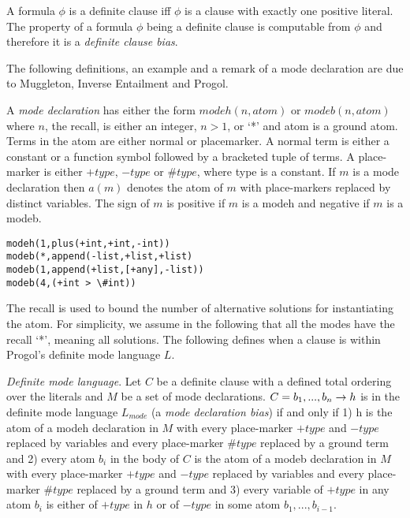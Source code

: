 \begin{defn}
A formula $\phi$ is a definite clause iff $\phi$ is a clause with exactly one positive literal. The property of a formula $\phi$ being a definite clause is computable from $\phi$ and therefore it is a \emph{definite clause bias}.
\end{defn}

The following definitions, an example and a remark of a mode declaration are due to Muggleton, Inverse Entailment and Progol\cite{muggleton1995inverse}.
\begin{defn}\cite{muggleton1995inverse}
A \emph{mode declaration} has either the form
$modeh(n,atom)$ or $modeb(n,atom)$ where $n$, the recall, is either an integer, $n > 1$,
or `*' and atom is a ground atom. Terms in the atom are either normal or placemarker. A normal term is either a constant or a function symbol followed by a
bracketed tuple of terms. A place-marker is either $+type$, $-type$ or $\#type$, where
type is a constant. If $m$ is a mode declaration then $a(m)$ denotes the atom of $m$
with place-markers replaced by distinct variables. The sign of $m$ is positive if $m$ is a modeh and negative if $m$ is a modeb.
\end{defn}

\begin{exmp}
\cite{muggleton1995inverse}
\begin{lstlisting}
modeh(1,plus(+int,+int,-int))
modeb(*,append(-list,+list,+list)
modeb(1,append(+list,[+any],-list))
modeb(4,(+int > \#int))
\end{lstlisting}
\end{exmp}

\begin{remark}
\cite{muggleton1995inverse}
The recall is used to bound the number of alternative solutions for instantiating
the atom. For simplicity, we assume in the following that all the modes have the
recall `*', meaning all solutions. The following defines when a clause is within
Progol's definite mode language $L$.
\end{remark}

\begin{defn}
\cite{muggleton1995inverse}
\emph{Definite mode language}. Let $C$ be a definite clause with a
defined total ordering over the literals and $M$ be a set of mode declarations. $C = b_1, ..., b_n \to h$ is in the definite mode language $L_{mode}$ (a \emph{mode declaration bias}) if and only if
1) h is the atom
of a modeh declaration in $M$ with every place-marker $+type$ and $-type$ replaced by
variables and every place-marker $\#type$ replaced by a ground term and 2) every
atom $b_i$ in the body of $C$ is the atom of a modeb declaration in $M$ with every
place-marker $+type$ and $-type$ replaced by variables and every place-marker $\#type$
replaced by a ground term and 3) every variable of $+type$ in any atom $b_i$ is either
of $+type$ in $h$ or of $-type$ in some atom $b_1, ..., b_{i-1}$.
\end{defn}


